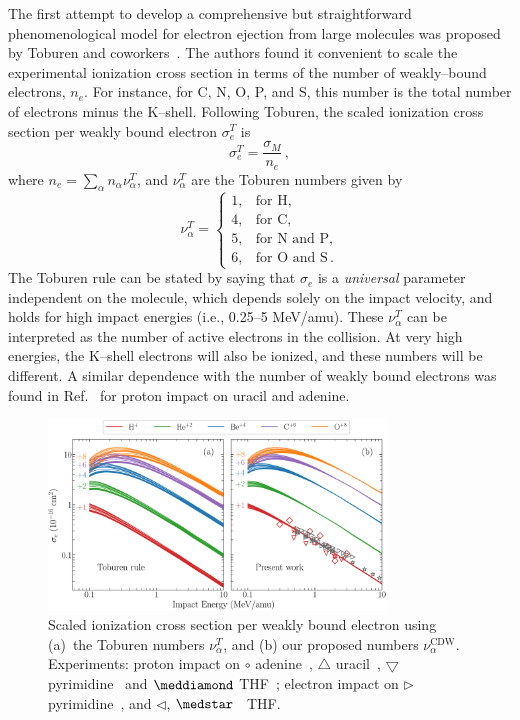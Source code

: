 \documentclass[10pt,showpacs,twocolumn]{revtex4}
\begin{document}
The first attempt to develop a comprehensive but straightforward 
phenomenological model for electron ejection from large molecules was 
proposed by Toburen and coworkers~\cite{toburen1975,toburen1976}. 
The authors found it convenient to scale the experimental ionization 
cross section in terms of the number of weakly--bound electrons, $n_e$.
For instance, for C, N, O, P, and S, this number is the total number of 
electrons minus the K--shell. Following Toburen, the scaled ionization 
cross section per weakly bound electron $\sigma_{e}^T$ is
\begin{equation}
\sigma_{e}^T=\frac{\sigma_{M}}{n_e}\,, 
\label{27} 
\end{equation}
where $n_e=\sum_{\alpha}n_{\alpha}\nu_{\alpha}^T$, and $\nu_{\alpha}^T$ 
are the Toburen numbers given by
\begin{equation}
\nu_{\alpha}^T=\left\{ 
\begin{array}{ll}
1, & \text{for H,} \\
4, & \text{for C,} \\ 
5, & \text{for N and P,} \\ 
6, & \text{for O and S}\,.
\end{array}\right.
\label{eq:nelec} 
\end{equation} 
The Toburen rule can be stated by saying that 
$\sigma_{e}$ is a \textit{universal} parameter independent on the 
molecule, which depends solely on the impact velocity, and holds for 
high impact energies (i.e., 0.25--5 MeV/amu).
These $\nu_{\alpha}^T$ can be interpreted as the number of active 
electrons in the collision. At very high energies, the K--shell 
electrons will also be ionized, and these numbers will be different.
A similar dependence with the number of weakly bound electrons was 
found in Ref.~\cite{itoh2013} for proton impact on uracil and adenine.

\begin{figure}[t!]
\centering
\includegraphics[width=0.8\textwidth]{molscaling85.eps}
\caption{Scaled ionization cross section per weakly bound electron using
(a)~the Toburen numbers $\nu_{\alpha}^T$, and (b) our proposed numbers
$\nu_{\alpha}^{\text{CDW}}$. Experiments: proton impact on 
\mbox{\Large$\circ$} adenine~\cite{iriki2011}, 
$\triangle$ uracil~\cite{itoh2013}, 
$\bigtriangledown$ pyrimidine~\cite{wolff2014} and $\meddiamond$ 
THF~\cite{wang2016}; electron impact on $\rhd$ pyrimidine~\cite{bug2017},
and $\lhd$, $\medstar$~\cite{wolf2019,fuss2009} THF.}
\label{fig:newscaling}
\end{figure}
\end{document}
